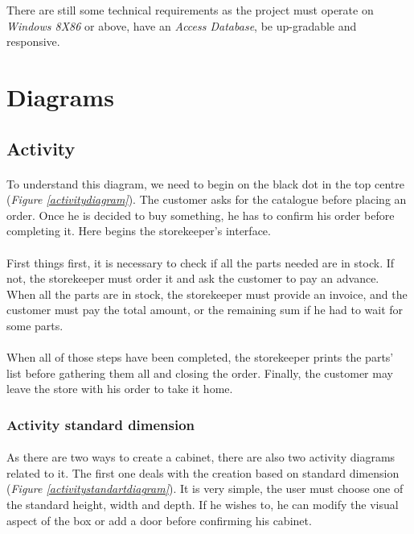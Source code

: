 \documentclass[12pt,oneside]{report}
\begin{document}
    There are still some technical requirements as the project must operate on \textit{Windows 8X86} or above, have an \textit{Access Database}, be up-gradable and responsive.

\newpage
\section{Diagrams}
    \subsection{Activity}
        \paragraph{}
        To understand this diagram, we need to begin on the black dot in the top centre (\textit{Figure \ref{activitydiagram}}). The customer asks for the catalogue before placing an order. Once he is decided to buy something, he has to confirm his order before completing it. Here begins the storekeeper’s interface. 
        
        \paragraph{}
        First things first, it is necessary to check if all the parts needed are in stock. If not, the storekeeper must order it and ask the customer to pay an advance. When all the parts are in stock, the storekeeper must provide an invoice, and the customer must pay the total amount, or the remaining sum if he had to wait for some parts.
        
        \paragraph{}
        When all of those steps have been completed, the storekeeper prints the parts’ list before gathering them all and closing the order. Finally, the customer may leave the store with his order to take it home. 
    \vspace{\baselineskip}
    \vspace{\baselineskip}
    
    \subsubsection{Activity standard dimension}
        \paragraph{}
        As there are two ways to create a cabinet, there are also two activity diagrams related to it. The first one deals with the creation based on standard dimension (\textit{Figure \ref{activitystandartdiagram}}). It is very simple, the user must choose one of the standard height, width and depth. If he wishes to, he can modify the visual aspect of the box or add a door before confirming his cabinet.
    \vspace{\baselineskip}
    \vspace{\baselineskip}
    
\end{document}
